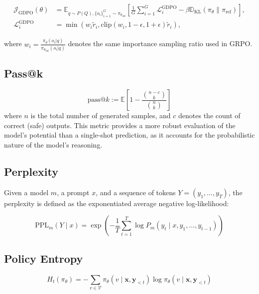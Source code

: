 \documentclass{article}
\begin{document}
$$\begin{aligned}
\mathcal{J}_{\mathrm{GDPO}}(\theta) &= \mathbb{E}_{q \sim P(Q), \{o_i\}_{i=1}^G \sim \pi_{\theta_{\text{old}}}} \left[ \frac{1}{G} \sum_{i=1}^G \mathcal{L}_i^{\mathrm{GDPO}} - \beta \mathbb{D}_{\mathrm{KL}}(\pi_\theta \| \pi_{\text{ref}}) \right], \\
\mathcal{L}_i^{\mathrm{GDPO}} &= \min \left( w_i \tilde{r}_i, \text{clip}(w_i, 1-\epsilon, 1+\epsilon)\tilde{r}_i \right),
\end{aligned}$$

where $w_i = \frac{\pi_\theta(o_i|q)}{\pi_{\theta_{\text{old}}}(o_i|q)}$ denotes the same importance sampling ratio used in GRPO.


\subsection{Pass@k}
\label{appendix:implementations_passk}
\begin{equation}
\text{pass}@k := \mathbb{E} \left[ 1 - \frac{\binom{n-c}{k}}{\binom{n}{k}} \right]
\label{eq:pass_at_k}
\end{equation}
\noindent where $n$ is the total number of generated samples, and $c$ denotes the count of correct (safe) outputs. This metric provides a more robust evaluation of the model's potential than a single-shot prediction, as it accounts for the probabilistic nature of the model's reasoning.



\subsection{Perplexity}
\label{appendix:implementations_perplexity}
Given a model $m$, a prompt $x$, and a sequence of tokens $Y = (y_1, \dots, y_T)$, the perplexity is defined as the exponentiated average negative log-likelihood:

$$
\mathrm{PPL}_m(Y \mid x) = \exp \left( -\frac{1}{T} \sum_{t=1}^{T} \log P_m(y_t \mid x, y_1, \ldots, y_{t-1}) \right)
$$



\subsection{Policy Entropy}
\label{appendix:implementations_policy_entropy}
\begin{equation}
    H_t(\pi_\theta) = -\sum_{v \in \mathcal{V}} \pi_\theta(v \mid \mathbf{x}, \mathbf{y}_{<t}) \log \pi_\theta(v \mid \mathbf{x}, \mathbf{y}_{<t})
\end{equation}
\end{document}
